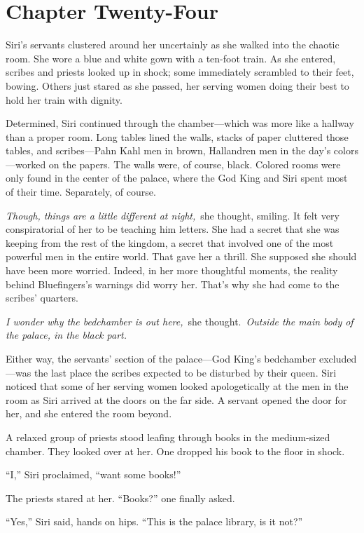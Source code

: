 \section{Chapter Twenty-Four}

Siri’s servants clustered around her uncertainly as she walked into the chaotic room. She wore a blue and white gown with a ten-foot train. As she entered, scribes and priests looked up in shock; some immediately scrambled to their feet, bowing. Others just stared as she passed, her serving women doing their best to hold her train with dignity.

Determined, Siri continued through the chamber—which was more like a hallway than a proper room. Long tables lined the walls, stacks of paper cluttered those tables, and scribes—Pahn Kahl men in brown, Hallandren men in the day’s colors—worked on the papers. The walls were, of course, black. Colored rooms were only found in the center of the palace, where the God King and Siri spent most of their time. Separately, of course.

\textit{Though, things are a little different at night,}~she thought, smiling. It felt very conspiratorial of her to be teaching him letters. She had a secret that she was keeping from the rest of the kingdom, a secret that involved one of the most powerful men in the entire world. That gave her a thrill. She supposed she should have been more worried. Indeed, in her more thoughtful moments, the reality behind Bluefingers’s warnings did worry her. That’s why she had come to the scribes’ quarters.

\textit{I wonder why the bedchamber is out here,}~she thought.~\textit{Outside the main body of the palace, in the black part.}

Either way, the servants’ section of the palace—God King’s bedchamber excluded—was the last place the scribes expected to be disturbed by their queen. Siri noticed that some of her serving women looked apologetically at the men in the room as Siri arrived at the doors on the far side. A servant opened the door for her, and she entered the room beyond.

A relaxed group of priests stood leafing through books in the medium-sized chamber. They looked over at her. One dropped his book to the floor in shock.

“I,” Siri proclaimed, “want some books!”

The priests stared at her. “Books?” one finally asked.

“Yes,” Siri said, hands on hips. “This is the palace library, is it not?”

